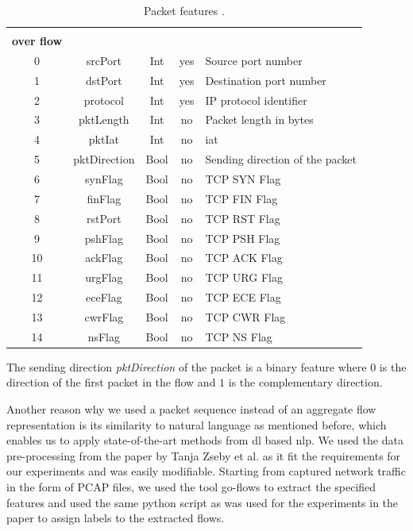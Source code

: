 \begin{table}[H]
	\centering
	\begin{tabular}{c c c c l}
		\thead{\textbf{\#}} & \thead{\textbf{Name}} & \thead{\textbf{Type}} & \thead{\textbf{Constant} \\ \textbf{over flow}} & \thead{\textbf{Description}} \\ \hline \midrule
		0 & srcPort & Int & yes & Source port number \\ \midrule
		1 & dstPort & Int & yes & Destination port number \\ \midrule
		2 & protocol & Int & yes & IP protocol identifier \\ \midrule
		3 & pktLength & Int & no & Packet length in bytes \\ \midrule
		4 & pktIat & Int & no & \gls{iat} \\ \midrule
		5 & pktDirection & Bool & no & Sending direction of the packet \\ \midrule
		6 & synFlag & Bool & no & TCP SYN Flag \\ \midrule
		7 & finFlag & Bool & no & TCP FIN Flag \\ \midrule
		8 & rstPort & Bool & no & TCP RST Flag \\ \midrule
		9 & pshFlag & Bool & no & TCP PSH Flag \\ \midrule
		10 & ackFlag & Bool & no & TCP ACK Flag \\ \midrule
		11 & urgFlag & Bool & no & TCP URG Flag \\ \midrule
		12 & eceFlag & Bool & no & TCP ECE Flag \\ \midrule
		13 & cwrFlag & Bool & no & TCP CWR Flag \\ \midrule
		14 & nsFlag & Bool & no & TCP NS Flag \\ \midrule
	\end{tabular}
	\caption{Packet features \cite{cic_ids_2017_analysis}.}
	\label{table:methodology:data_representation:features}
\end{table}

The sending direction \textit{pktDirection} of the packet is a binary feature where $0$ is the direction of the first packet in the flow and $1$ is the complementary direction.

Another reason why we used a packet sequence instead of an aggregate flow representation is its similarity to natural language as mentioned before, which enables us to apply state-of-the-art methods from \gls{dl} based \gls{nlp}. We used the data pre-processing from the paper \cite{adversarial_recurrent_ids} by Tanja Zseby et al. as it fit the requirements for our experiments and was easily modifiable. Starting from captured network traffic in the form of PCAP files, we used the tool go-flows \cite{go_flows} to extract the specified features and used the same python script as was used for the experiments in the paper \cite{adversarial_recurrent_ids} to assign labels to the extracted flows.

